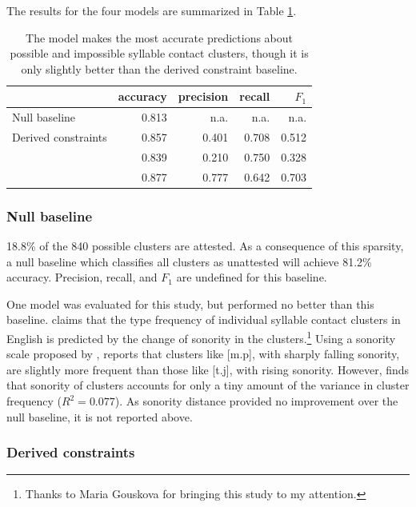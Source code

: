 The results for the four models are summarized in Table \ref{cmresults}. 

\begin{table} \label{cmresults}
\centering
\begin{tabular}{l | r r r r}
\toprule
                          & accuracy & precision & recall & $F_1$ \\ 
\midrule
Null baseline             & 0.813    & n.a.      & n.a.   & n.a.  \\
Derived constraints       & 0.857    & 0.401     & 0.708  & 0.512 \\
\citet{Pierrehumbert1994} & 0.839    & 0.210     & 0.750  & 0.328 \\
\citet{Hayes2008a}        & 0.877    & 0.777     & 0.642  & 0.703 \\
\bottomrule
\end{tabular}
\caption{The \citeauthor{Hayes2008a} model makes the most accurate predictions about possible and impossible syllable contact clusters, though it is only slightly better than the derived constraint baseline.}
\end{table}

\subsubsection{Null baseline}

18.8\% of the 840 possible clusters are attested. As a consequence of this sparsity, a null baseline which classifies all clusters as unattested will achieve 81.2\% accuracy. Precision, recall, and $F_1$ are undefined for this baseline.

One model was evaluated for this study, but performed no better than this baseline. \citet{McGowan2009} claims that the type frequency of individual syllable contact clusters in English is predicted by the change of sonority in the clusters.\footnote{Thanks to Maria Gouskova for bringing this study to my attention.} Using a sonority scale proposed by \citet{Jespersen1904}, \citeauthor{McGowan2009} reports that clusters like [m.p], with sharply falling sonority, are slightly more frequent than those like [t.j], with rising sonority. However, \citeauthor{McGowan2009} finds that sonority of clusters accounts for only a tiny amount of the variance in cluster frequency ($R^2 = 0.077$). As sonority distance provided no improvement over the null baseline, it is not reported above.

\subsubsection{Derived constraints}

